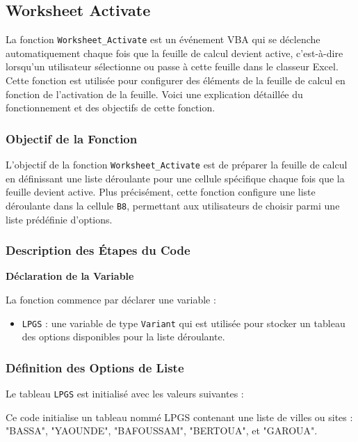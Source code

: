 \documentclass[a4paper, oneside, 12pt, final]{extreport}
\begin{document}
\subsection{Worksheet Activate}

La fonction \texttt{Worksheet\_Activate} est un événement VBA qui se déclenche automatiquement chaque fois que la feuille de calcul devient active, c'est-à-dire lorsqu'un utilisateur sélectionne ou passe à cette feuille dans le classeur Excel. Cette fonction est utilisée pour configurer des éléments de la feuille de calcul en fonction de l'activation de la feuille. Voici une explication détaillée du fonctionnement et des objectifs de cette fonction.

\subsubsection{Objectif de la Fonction}

L'objectif de la fonction \texttt{Worksheet\_Activate} est de préparer la feuille de calcul en définissant une liste déroulante pour une cellule spécifique chaque fois que la feuille devient active. Plus précisément, cette fonction configure une liste déroulante dans la cellule \texttt{B8}, permettant aux utilisateurs de choisir parmi une liste prédéfinie d'options.

\subsubsection{Description des Étapes du Code}

\textbf{Déclaration de la Variable}

La fonction commence par déclarer une variable :

\begin{itemize}
    \item \texttt{LPGS} : une variable de type \texttt{Variant} qui est utilisée pour stocker un tableau des options disponibles pour la liste déroulante.
\end{itemize}

\subsubsection{Définition des Options de Liste}

Le tableau \texttt{LPGS} est initialisé avec les valeurs suivantes :

Ce code initialise un tableau nommé LPGS contenant une liste de villes ou sites : "BASSA", "YAOUNDE", "BAFOUSSAM", "BERTOUA", et "GAROUA".
\end{document}
